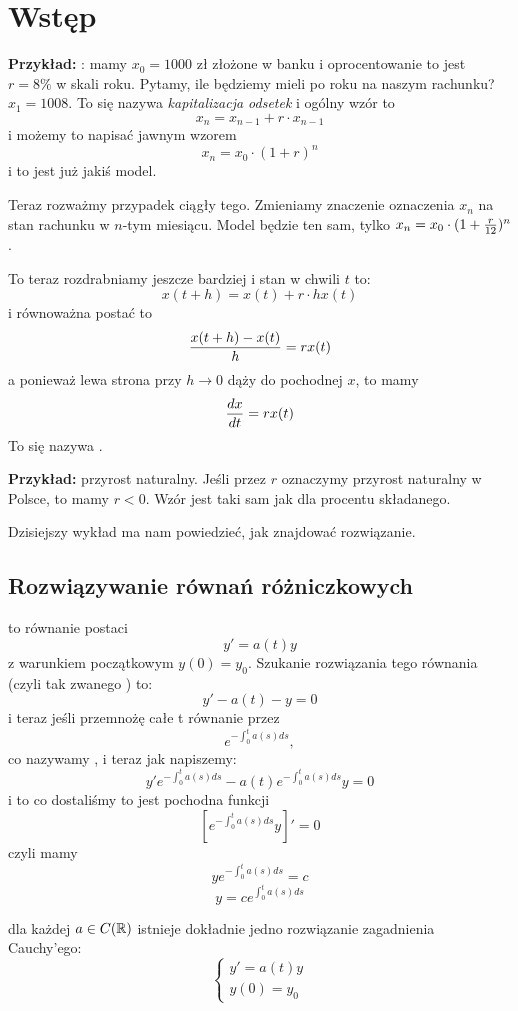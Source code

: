\section{Wstęp}

\textbf{Przykład:} : mamy $x_0=1000$ zł złożone w banku i oprocentowanie to jest $r = 8\%$ w skali roku. Pytamy, ile będziemy mieli po roku na naszym rachunku? $x_1=1008$. To się nazywa \emph{kapitalizacja odsetek} i ogólny wzór to
$$x_n=x_{n-1}+r\cdot x_{n-1}$$
i możemy to napisać jawnym wzorem
$$x_n=x_0\cdot(1+r)^n$$
i to jest już jakiś model. 

Teraz rozważmy przypadek ciągły tego. Zmieniamy znaczenie oznaczenia $x_n$ na stan rachunku w $n$-tym miesiącu. Model będzie ten sam, tylko $x_n=x_0\cdot(1+{r\over12})^n$.

To teraz rozdrabniamy jeszcze bardziej i stan w chwili $t$ to:
$$x(t+h)=x(t)+r\cdot h x(t)$$
i równoważna postać to
$${x(t+h)-x(t)\over h}=rx(t)$$
a ponieważ lewa strona przy $h\to 0$ dąży do pochodnej $x$, to mamy
$${dx\over dt}=rx(t)$$
To się nazywa .
\smallskip

\textbf{Przykład:} przyrost naturalny. Jeśli przez $r$ oznaczymy przyrost naturalny w Polsce, to mamy $r<0$. Wzór jest taki sam jak dla procentu składanego.

Dzisiejszy wykład ma nam powiedzieć, jak znajdować rozwiązanie.

\subsection{Rozwiązywanie równań różniczkowych}

 to równanie postaci
$$y'=a(t)y$$
z warunkiem początkowym $y(0)=y_0$. Szukanie rozwiązania tego równania (czyli tak zwanego ) to:
$$y'-a(t)-y=0$$
i teraz jeśli przemnożę całe t równanie przez
$$e^{-\int_0^t a(s)ds},$$
co nazywamy , i teraz jak napiszemy:
$$y'e^{-\int_0^ta(s)ds}-a(t)e^{-\int_0^ta(s)ds}y=0$$
i to co dostaliśmy to jest pochodna funkcji
$$\left[e^{-\int_0^ta(s)ds}y\right]'=0$$
czyli mamy
$$ye^{-\int_0^ta(s)ds}=c$$
$$y=ce^{\int_0^ta(s)ds}$$

 dla każdej $a\in C(\mathbb{R})$ istnieje dokładnie jedno rozwiązanie zagadnienia Cauchy'ego:
$$\begin{cases}
    y'=a(t)y\\
    y(0)=y_0
\end{cases}$$

